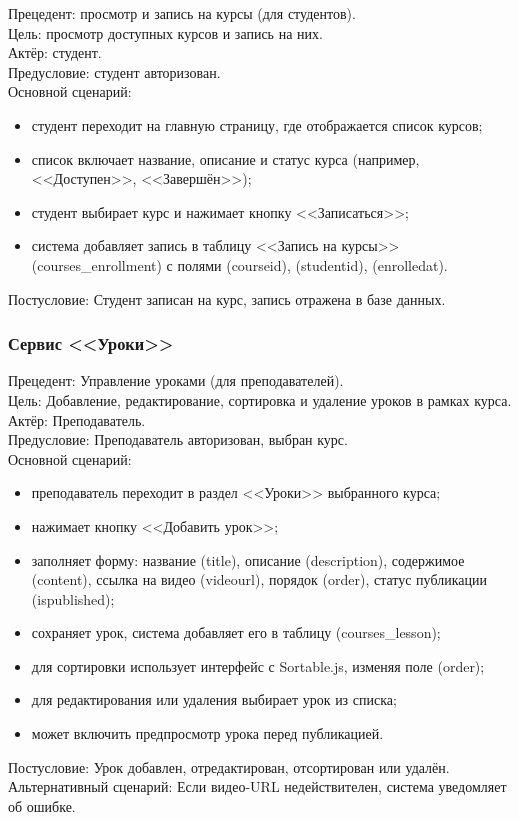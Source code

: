 	{Прецедент: просмотр и запись на курсы (для студентов)}. \\
	{Цель}: просмотр доступных курсов и запись на них. \\
	{Актёр}: студент. \\
	{Предусловие}: студент авторизован. \\
	{Основной сценарий}:
	\begin{itemize}
		\item студент переходит на главную страницу, где отображается список курсов;
		\item список включает название, описание и статус курса (например, <<Доступен>>, <<Завершён>>);
		\item студент выбирает курс и нажимает кнопку <<Записаться>>;
		\item система добавляет запись в таблицу <<Запись на курсы>> (courses\_enrollment) с полями (courseid), (studentid), (enrolledat).
	\end{itemize}
	{Постусловие}: Студент записан на курс, запись отражена в базе данных.
	
\subsubsection {Сервис <<Уроки>>}
	
	{Прецедент: Управление уроками (для преподавателей)}. \\
	{Цель}: Добавление, редактирование, сортировка и удаление уроков в рамках курса. \\
	{Актёр}: Преподаватель. \\
	{Предусловие}: Преподаватель авторизован, выбран курс. \\
	{Основной сценарий}:
	\begin{itemize}
		\item преподаватель переходит в раздел <<Уроки>> выбранного курса;
		\item нажимает кнопку <<Добавить урок>>;
		\item заполняет форму: название (title), описание (description), содержимое (content), ссылка на видео (videourl), порядок (order), статус публикации (ispublished);
		\item сохраняет урок, система добавляет его в таблицу (courses\_lesson);
		\item для сортировки использует интерфейс с Sortable.js, изменяя поле (order);
		\item для редактирования или удаления выбирает урок из списка;
		\item может включить предпросмотр урока перед публикацией.
	\end{itemize}
	{Постусловие}: Урок добавлен, отредактирован, отсортирован или удалён. \\
	{Альтернативный сценарий}: Если видео-URL недействителен, система уведомляет об ошибке.
	
